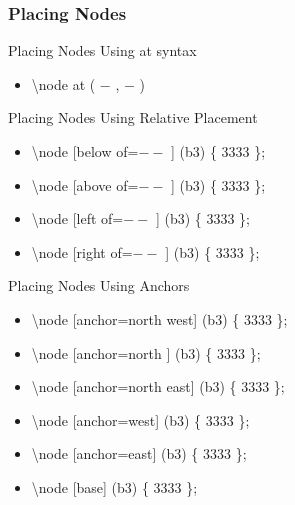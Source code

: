 \documentclass[ aspectratio=169,  10pt,blue,xcolor=pdftex,dvipsnames,table,handout,notes]{beamer}
\begin{document}
		\begin{frame}[t]
		\frametitle{Placing Nodes}

			\begin{block}{Placing Nodes Using at syntax}
			\begin{itemize}
			\item[] 	\textbackslash node at ( $-$ , $-$ )
			\end{itemize}
			\end{block}

			\begin{block}{Placing Nodes Using Relative Placement}
			\begin{itemize}
			\item[] 	\textbackslash node [below of=$--$ ] (b3) \{ 3333 \};
			\item[] 	\textbackslash node [above of=$--$ ] (b3) \{ 3333 \};
			\item[] 	\textbackslash node [left of=$--$ ] (b3) \{ 3333 \};
			\item[] 	\textbackslash node [right of=$--$ ] (b3) \{ 3333 \};
 			\end{itemize}
			\end{block}

			\begin{block}{Placing Nodes Using Anchors}
			\begin{itemize}
			\item[] 	\textbackslash node [anchor=north west] (b3) \{ 3333 \};
			\item[] 	\textbackslash node [anchor=north ] (b3) \{ 3333 \};
			\item[] 	\textbackslash node [anchor=north east] (b3) \{ 3333 \};
			\item[] 	\textbackslash node [anchor=west] (b3) \{ 3333 \};
			\item[] 	\textbackslash node [anchor=east] (b3) \{ 3333 \};
			\item[] 	\textbackslash node [base] (b3) \{ 3333 \};
 			\end{itemize}
			\end{block}

	
		\note[item]{ }
		\end{frame}




		\begin{frame}[plain]

			\centering
			\scalebox{4}{Tikz Style}
	
		\note[item]{ }
		\end{frame}
\end{document}

